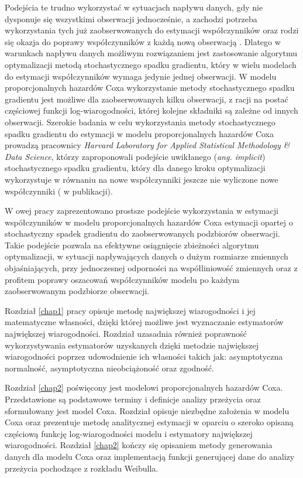 Podejścia te trudno wykorzystać w sytuacjach napływu danych, gdy nie dysponuje się wszystkimi obserwacji jednocześnie, a zachodzi potrzeba wykorzystania tych już zaobserwowanych do estymacji współczynników oraz rodzi się okazja do poprawy współczynników z każdą nową obserwacją \cite{bottDOD}. Dlatego w warunkach napływu danych możliwym rozwiązaniem jest zastosowanie algorytmu optymalizacji metodą stochastycznego spadku gradientu, który w wielu modelach do estymacji współczynników wymaga jedynie jednej obserwacji. W modelu proporcjonalnych hazardów Coxa wykorzystanie metody stochastycznego spadku gradientu jest możliwe dla zaobserwowanych kilku obserwacji, z racji na postać częściowej funkcji log-wiarogodności, której kolejne składniki są zależne od innych obserwacji. Szerokie badania w celu wykorzystania metody stochastycznego spadku gradientu do estymacji w modelu proporcjonalnych hazardów Coxa prowadzą pracownicy \textit{Harvard Laboratory for Applied Statistical Methodology \& Data Science}, którzy zaproponowali podejście uwikłanego (\textit{ang. implicit}) stochastycznego spadku gradientu, który dla danego kroku optymalizacji wykorzystuje w równaniu na nowe współczynniki jeszcze nie wyliczone nowe współczynniki (\cite{toulis} w publikacji).  

 W owej pracy zaprezentowano prostsze podejście wykorzystania w estymacji współczynników w modelu proporcjonalnych hazardów Coxa estymacji opartej o stochastyczny spadek gradientu do zaobserwowanych podzbiorów obserwacji. Takie podejście pozwala na efektywne osiągnięcie zbieżności algorytmu optymalizacji, w sytuacji napływających danych o dużym rozmiarze zmiennych objaśniających, przy jednoczesnej odporności na współliniowość zmiennych oraz z profitem poprawy oszacowań współczynników modelu po każdym zaobserwowanym podzbiorze obserwacji.

Rozdział \ref{chap1} pracy opisuje metodę największej wiarogodności i jej matematyczne własności, dzięki której możliwe jest wyznaczanie estymatorów największej wiarogodności. Rozdział uzasadnia również poprawność wykorzystywania estymatorów uzyskanych dzięki metodzie największej wiarogodności poprzez udowodnienie ich własności takich jak: asymptotyczna normalność, asymptotyczna nieobciążoność oraz zgodność. 

Rozdział \ref{chap2} poświęcony jest modelowi proporcjonalnych hazardów Coxa. Przedstawione są podstawowe terminy i definicje analizy przeżycia oraz sformułowany jest model Coxa. Rozdział opisuje niezbędne założenia w modelu Coxa oraz prezentuje metodę analitycznej estymacji w oparciu o szeroko opisaną częściową funkcję log-wiarogodności modelu i estymatory największej wiarogodności. Rozdział \ref{chap2} kończy się opisaniem metody generowania danych dla modelu Coxa oraz implementacją funkcji generującej dane do analizy przeżycia pochodzące z rozkładu Weibulla. 

